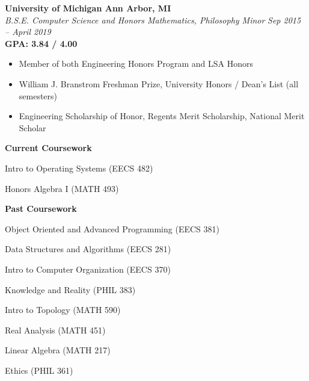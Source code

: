 \documentclass[margin,line]{resume}
\begin{document}
\begin{resume}
    \textbf{University of Michigan \hfill Ann Arbor, MI} \\\vspace{1mm}%
    \textsl{B.S.E. Computer Science and Honors Mathematics, Philosophy Minor} \hfill \textsl{Sep 2015 -- April 2019} \\
    \textbf{GPA: 3.84 / 4.00} \\\vspace{-3.5mm}
    \begin{itemize}    
    \item Member of both Engineering Honors Program and LSA Honors
    \item William J. Branstrom Freshman Prize, University Honors / Dean's List (all semesters)
    \item Engineering Scholarship of Honor, Regents Merit Scholarship, National Merit Scholar
    \end{itemize}
    \vspace{-5mm}
    \begin{center} \textbf{Current Coursework} \end{center}
    \vspace{-3mm}
    \begin{itemize}
\begin{minipage}[t]{.66\linewidth}
    \item Intro to Operating Systems (EECS 482)
\end{minipage}%
\begin{minipage}[t]{.5\linewidth}
    \item Honors Algebra I (MATH 493)
\end{minipage}
\end{itemize}

\vspace{-9.5mm}
    \begin{center} \textbf{Past Coursework} \end{center}
    \vspace{-3mm}
    \begin{itemize}
    \begin{minipage}[t]{.66\linewidth}
    \item Object Oriented and Advanced Programming (EECS 381)
    \item Data Structures and Algorithms (EECS 281)
    \item Intro to Computer Organization (EECS 370)
    \item Knowledge and Reality (PHIL 383)
\end{minipage}%
\begin{minipage}[t]{.5\linewidth}
    \item Intro to Topology (MATH 590)
    \item Real Analysis (MATH 451)
    \item Linear Algebra (MATH 217)
    \item Ethics (PHIL 361)
\end{minipage}
\end{itemize}
\vspace{-1.5mm}


\end{resume}
\end{document}
